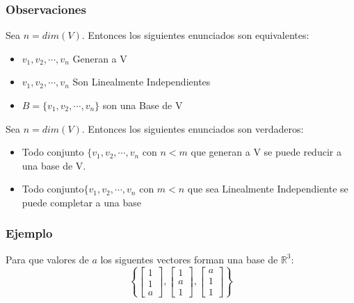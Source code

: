 \documentclass[12pt]{report}							    %
\begin{document}
        \subsubsection{Observaciones}
        Sea $n = dim(V)$. Entonces los siguientes enunciados son equivalentes:
        \begin{itemize}
            \item $v_1, v_2, \cdots ,v_n$ Generan a V
            \item $v_1, v_2, \cdots ,v_n$ Son Linealmente Independientes
            \item $B = \{ v_1, v_2, \cdots ,v_n \}$ son una Base de V
        \end{itemize}

        Sea $n = dim(V)$. Entonces los siguientes enunciados son verdaderos:
        \begin{itemize}
            \item Todo conjunto $\{ v_1, v_2, \cdots ,v_n$ con $n < m$ que generan a V
            se puede reducir a una base de V.

            \item Todo conjunto$\{ v_1, v_2, \cdots ,v_n$ con $m < n$ que sea Linealmente
            Independiente se puede completar a una base
        \end{itemize}

        \subsubsection{Ejemplo}

            Para que valores de $a$ los siguentes vectores forman una base de $\mathbb{R}^3$:
            \begin{equation*}
                \left\{
                    \begin{bmatrix} 1 \\ 1 \\ a \end{bmatrix},
                    \begin{bmatrix} 1 \\ a \\ 1 \end{bmatrix},
                    \begin{bmatrix} a \\ 1 \\ 1 \end{bmatrix} 
                \right\}
            \end{equation*}
\end{document}
